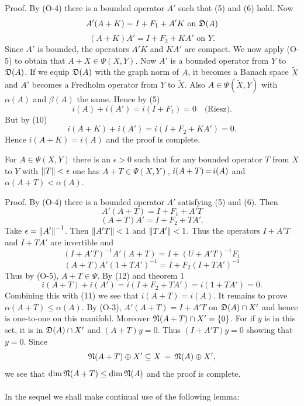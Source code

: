 \documentclass[11pt,twoside]{article}
\begin{document}
Proof.
By (O-4) there is a bounded operator $A'$ such that (5) and (6) hold.
Now
\[
A'(A + K) = I+F_1 +A'K \mbox{ on } \mathfrak{D}(A)
\]
\begin{equation}\tag{10}
(A+K)A' = I +F_2 +KA' \mbox{ on } Y.
\end{equation}
Since $A'$ is bounded, the operators $A'K$ and $KA'$ are compact.
We now apply (O-5) to obtain that $A + X \in \Psi(X,Y)$.
Now $A'$ is a bounded operator from $Y$ to $\mathfrak{D}(A)$.
If we equip $\mathfrak{D}(A)$ with the graph norm of $A$,
it becomes a Banach space $\tilde{X}$
and $A'$ becomes a Fredholm operator from $Y$ to $\tilde{X}$.
Also $A \in \Psi(\tilde{X},Y)$ with $\alpha(A)$ and $\beta(A)$ the same.
Hence by (5)
\begin{equation}\tag{11}
i(A) + i(A') = i(I+F_1) = 0 \quad \mbox{(Riesz)}.
\end{equation}
But by (10)
\[
i(A+K) + i(A') = i(I+F_2 + KA') = 0.
\]
Hence $i(A+K) = i(A)$ and the proof is complete.

\begin{theorem1} %
For $A \in \Psi(X,Y)$ there is an $\epsilon > 0$
such that
for any bounded operator $T$ from $X$ to $Y$
with $\left\lVert T \right\rVert < \epsilon$ one has
$A + T \in \Psi(X,Y)$, $i(A+T) {\,=\,} i(A)$ and $\alpha(A+T) < \alpha(A)$.
\end{theorem1}

Proof.
By (O-4) there is a bounded operator $A'$ satisfying (5) and (6).
Then
\[
A'(A + T) = I +F_1 +A'T
\]
\begin{equation}\tag{12}
(A+T)A' = I+F_2+TA'.
\end{equation}
Take $\epsilon = \left\lVert A' \right\rVert^{-1}$.
Then $\left\lVert A'T \right\rVert < 1$ and $\left\lVert TA' \right\rVert < 1$.
Thus the operators $I +A'T$ and $I+TA'$ are invertible and
\[
(I + A'T)^{-1}A'(A+T) = I + (U+A'T)^{-1}F_1
\]
\[
(A + T)A'(1+TA')^{-1} = I + F_2(I+TA')^{-1}
\]
Thus by (O-5), $A+T \in \Psi$.
By (12) and theorem 1
\[
i(A+T) + i(A') = i(I+F_2+TA') = i(1+TA') = 0.
\]
Combining this with (11) we see that $i(A+T) = i(A)$.
It remains to prove $\alpha(A + T) \leq \alpha(A)$.
By (O-3),
$A'(A + T) = I + A'T$ on $\mathfrak{D}(A) \cap X'$
and hence is one-to-one on this manifold.
Moreover $\mathfrak{N}(A+T) \cap X' = \{0\}$.
For if $y$ is in this set,
it is in $\mathfrak{D}(A) \cap X'$ and $(A+T)y = 0$.
Thus $(I+A'T)y = 0$ showing that $y = 0$.
Since 
\[
\mathfrak{N}(A+T) \oplus X' \subseteq X \,=\, \mathfrak{N}(A) \oplus X',
\]
we see that $\operatorname{dim} \mathfrak{N}(A +T) \leq \operatorname{dim} \mathfrak{N}(A)$
and the proof is complete.

\paragraph*{}
In the sequel we shall make continual use of the following lemma:
\end{document}
